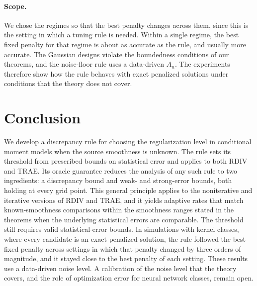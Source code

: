 \documentclass[12pt]{article}
\theoremstyle{plain}
\theoremstyle{definition}
\theoremstyle{remark}
\begin{document}
\paragraph{Scope.}
We chose the regimes so that the best penalty changes across them, since this is the setting in which a tuning rule is needed. Within a single regime, the best fixed penalty for that regime is about as accurate as the rule, and usually more accurate. The Gaussian designs violate the boundedness conditions of our theorems, and the noise-floor rule uses a data-driven $A_n$. The experiments therefore show how the rule behaves with exact penalized solutions under conditions that the theory does not cover.

\section{Conclusion}

We develop a discrepancy rule for choosing the regularization level in conditional moment models when the source smoothness is unknown. The rule sets its threshold from prescribed bounds on statistical error and applies to both RDIV and TRAE. Its oracle guarantee reduces the analysis of any such rule to two ingredients: a discrepancy bound and weak- and strong-error bounds, both holding at every grid point. This general principle applies to the noniterative and iterative versions of RDIV and TRAE, and it yields adaptive rates that match known-smoothness comparisons within the smoothness ranges stated in the theorems when the underlying statistical errors are comparable. The threshold still requires valid statistical-error bounds. In simulations with kernel classes, where every candidate is an exact penalized solution, the rule followed the best fixed penalty across settings in which that penalty changed by three orders of magnitude, and it stayed close to the best penalty of each setting. These results use a data-driven noise level. A calibration of the noise level that the theory covers, and the role of optimization error for neural network classes, remain open.




\newpage

\appendix 


\end{document}

